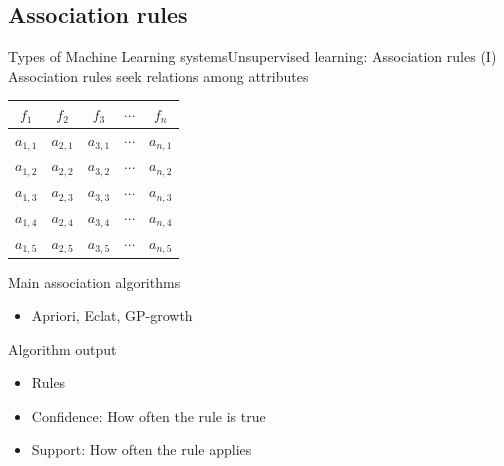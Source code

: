 \documentclass[10pt,compress]{beamer} %
\begin{document}
\subsection{Association rules}
\begin{frame}{Types of Machine Learning systems}{Unsupervised learning: Association rules (I)}
	Association rules seek relations among attributes

	\begin{center}
	\begin{tabular}{ccccc}\hline
		 $f_1$     & $f_2$     & $f_3$     & $\cdots$ & $f_n$     \\\hline
		 $a_{1,1}$ & $a_{2,1}$ & $a_{3,1}$ & $\cdots$ & $a_{n,1}$ \\
		 $a_{1,2}$ & $a_{2,2}$ & $a_{3,2}$ & $\cdots$ & $a_{n,2}$ \\
		 $a_{1,3}$ & $a_{2,3}$ & $a_{3,3}$ & $\cdots$ & $a_{n,3}$ \\
		 $a_{1,4}$ & $a_{2,4}$ & $a_{3,4}$ & $\cdots$ & $a_{n,4}$ \\
		 $a_{1,5}$ & $a_{2,5}$ & $a_{3,5}$ & $\cdots$ & $a_{n,5}$ \\
		 \hline
	 \end{tabular}
	 \end{center}

	 Main association algorithms
	 \begin{itemize}
	 	\item Apriori, Eclat, GP-growth
	 \end{itemize}
	 Algorithm output
	 \begin{itemize}
	 	\item Rules
		\item Confidence: How often the rule is true 
		\item Support: How often the rule applies 
	 \end{itemize}
\end{frame}
\end{document}
